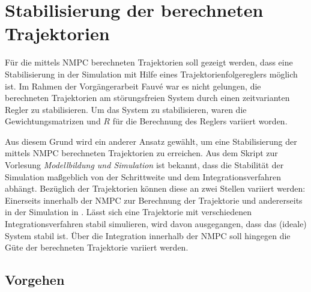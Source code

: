 %








\section{Stabilisierung der berechneten Trajektorien}\label{stabiltrj}

\newcommand{\scaleyplots}{0.6}

Für die mittels NMPC berechneten Trajektorien soll gezeigt werden, dass eine Stabilisierung in der Simulation mit Hilfe eines Trajektorienfolgereglers möglich ist. Im Rahmen der Vorgängerarbeit Fauvé \cite{fauve} war es nicht gelungen, die berechneten Trajektorien am störungsfreien System durch einen zeitvarianten Regler zu stabilisieren. Um das System zu stabilisieren, waren die Gewichtungsmatrizen  und $R$ für die Berechnung des Reglers variiert worden.

Aus diesem Grund wird ein anderer Ansatz gewählt, um eine Stabilisierung der mittels NMPC berechneten Trajektorien zu erreichen. Aus dem Skript \cite{modsim} zur Vorlesung \emph{Modellbildung und Simulation} ist bekannt, dass die Stabilität der Simulation maßgeblich von der Schrittweite und dem Integrationsverfahren abhängt. Bezüglich der Trajektorien können diese an zwei Stellen variiert werden: Einerseits innerhalb der NMPC zur Berechnung der Trajektorie und andererseits in der Simulation in \Simulink. Lässt sich eine Trajektorie mit verschiedenen Integrationsverfahren stabil simulieren, wird davon ausgegangen, dass das (ideale) System stabil ist. Über die Integration innerhalb der NMPC soll hingegen die Güte der berechneten Trajektorie variiert werden.


\subsection{Vorgehen}

